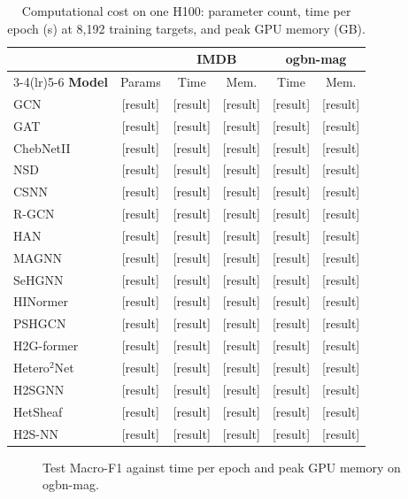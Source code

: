 \documentclass{article}
\newcommand{\method}{\textsc{H2S-NN}}
\newcommand{\res}{{\scriptsize[result]}}
\begin{document}
\begin{table}[!htbp]
  \centering
  \caption{Computational cost on one H100: parameter count, time per epoch (s) at 8,192 training targets, and peak GPU memory (GB).}
  \label{tab:cost}
  \scriptsize
  \setlength{\tabcolsep}{3pt}
  \begin{tabular}{lccccc}
    \toprule
    & & \multicolumn{2}{c}{IMDB} & \multicolumn{2}{c}{ogbn-mag} \\
    \cmidrule(lr){3-4}\cmidrule(lr){5-6}
    \textbf{Model} & Params & Time & Mem. & Time & Mem. \\
    \midrule
    GCN & \res & \res & \res & \res & \res \\
    GAT & \res & \res & \res & \res & \res \\
    ChebNetII & \res & \res & \res & \res & \res \\
    NSD & \res & \res & \res & \res & \res \\
    CSNN & \res & \res & \res & \res & \res \\
    R-GCN & \res & \res & \res & \res & \res \\
    HAN & \res & \res & \res & \res & \res \\
    MAGNN & \res & \res & \res & \res & \res \\
    SeHGNN & \res & \res & \res & \res & \res \\
    HINormer & \res & \res & \res & \res & \res \\
    PSHGCN & \res & \res & \res & \res & \res \\
    H2G-former & \res & \res & \res & \res & \res \\
    Hetero$^2$Net & \res & \res & \res & \res & \res \\
    H2SGNN & \res & \res & \res & \res & \res \\
    HetSheaf & \res & \res & \res & \res & \res \\
    \midrule
    \method{} & \res & \res & \res & \res & \res \\
    \bottomrule
  \end{tabular}
\end{table}

\begin{figure}[!htbp]
  \centering
  \caption{Test Macro-F1 against time per epoch and peak GPU memory on ogbn-mag.}
  \label{fig:cost}
\end{figure}
\end{document}
